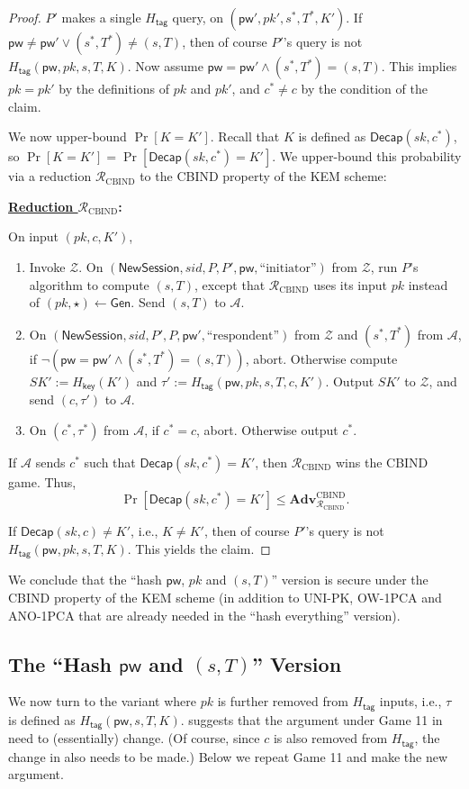 \documentclass{article}
\theoremstyle{plain}
\theoremstyle{definition}
\theoremstyle{remark}
\newcommand{\adv}{\mathcal{A}}
\newcommand{\env}{\mathcal{Z}}
\newcommand{\red}{\mathcal{R}}
\newcommand{\Adv}{\mathbf{Adv}}
\newcommand{\Gen}{\mathsf{Gen}}
\newcommand{\Decap}{\mathsf{Decap}}
\newcommand{\Hkey}{H_\mathsf{key}}
\newcommand{\Htag}{H_\mathsf{tag}}
\newcommand{\pw}{\mathsf{pw}}
\newcommand{\NewSession}{\mathsf{NewSession}}
\begin{document}
\begin{proof}
$P'$ makes a single $\Htag$ query, on $(\pw',pk',s^*,T^*,K')$. If $\pw \neq \pw' \lor (s^*,T^*) \neq (s,T)$, then of course $P'$'s query is not $\Htag(\pw,pk,s,T,K)$. Now assume $\pw = \pw' \land (s^*,T^*) = (s,T)$. This implies $pk = pk'$ by the definitions of $pk$ and $pk'$, and $c^* \neq c$ by the condition of the claim.

We now upper-bound $\Pr[K = K']$. Recall that $K$ is defined as $\Decap(sk,c^*)$, so $\Pr[K = K'] = \Pr[\Decap(sk,c^*) = K']$. We upper-bound this probability via a reduction $\red_\text{CBIND}$ to the CBIND property of the KEM scheme:

\medskip\noindent\textbf{\underline{Reduction $\red_\mathrm{CBIND}$}:}

\medskip\noindent
On input $(pk,c,K')$,
\begin{enumerate}
  \item Invoke $\env$. On $(\NewSession, sid, P, P', \pw, \text{``initiator''})$ from $\env$, run $P$'s algorithm to compute $(s,T)$, except that $\red_\mathrm{CBIND}$ uses its input $pk$ instead of $(pk,\star) \gets \Gen$. Send $(s,T)$ to $\adv$.
  \item On $(\NewSession, sid, P', P, \pw', \text{``respondent''})$ from $\env$ and $(s^*,T^*)$ from $\adv$, if $\neg(\pw = \pw' \land (s^*,T^*) = (s,T))$, abort. Otherwise compute $SK' := \Hkey(K')$ and $\tau' := \Htag(\pw,pk,s,T,c,K')$. Output $SK'$ to $\env$, and send $(c,\tau')$ to $\adv$.
  \item On $(c^*,\tau^*)$ from $\adv$, if $c^* = c$, abort. Otherwise output $c^*$.
\end{enumerate}

If $\adv$ sends $c^*$ such that $\Decap(sk,c^*) = K'$, then $\red_\text{CBIND}$ wins the CBIND game. Thus,
\[
\Pr[\Decap(sk,c^*) = K'] \leq \Adv_{\red_\text{CBIND}}^\text{CBIND}.
\]

If $\Decap(sk,c) \neq K'$, i.e., $K \neq K'$, then of course $P'$'s query is not $\Htag(\pw,pk,\allowbreak s,T,K)$. This yields the claim.
\end{proof}
We conclude that the ``hash $\pw$, $pk$ and $(s,T)$'' version is secure under the CBIND property of the KEM scheme (in addition to UNI-PK, OW-1PCA and ANO-1PCA that are already needed in the ``hash everything'' version).

\subsection{The ``Hash $\pw$ and $(s,T)$'' Version}
\label{sec:hash-pw-st}
We now turn to the variant where $pk$ is further removed from $\Htag$ inputs, i.e., $\tau$ is defined as $\Htag(\pw,s,T,K)$.  suggests that the argument under Game 11 in  need to (essentially) change. (Of course, since $c$ is also removed from $\Htag$, the change in  also needs to be made.) Below we repeat Game 11 and make the new argument.
\end{document}
